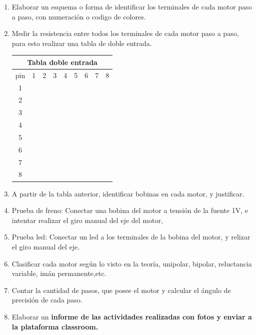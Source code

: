 \documentclass[../main]{subfiles}
\begin{document}
\begin{enumerate}
    \item Elaborar un esquema o forma de identificar los terminales de cada
      motor paso a paso, con numeración o codigo de colores.
    \item Medir la resistencia entre todos los terminales de cada motor
      paso a paso, para esto realizar una tabla de doble entrada.
\begin{center}    
\begin{tabular}{|c||c|c|c|c|c|c|c|c |}
\hline
\multicolumn{9}{|c|}{Tabla doble entrada} \\
\hline\hline
pin & 1 & 2 & 3 & 4 & 5 & 6 & 7 &8\\
\hline\hline
1 & & & & & & & &\\
\hline
2 & & & & & & & &\\
\hline
3 & & & & & & & &\\
\hline
4 & & & & & & & &\\
\hline
5 & & & & & & & &\\
\hline
6 & & & & & & & &\\
\hline
7 & & & & & & & &\\
\hline
8 & & & & & & & &\\
\hline
\end{tabular}
\end{center}
    \item A partir de la tabla anterior, identificar bobinas en cada motor, y justificar.
    \item Prueba de freno: Conectar una bobina del motor a tensión de la fuente 1V, e intentar realizar el giro manual del eje del motor,
    \item Prueba led: Conectar un led a los terminales de la bobina del motor, y relizar el giro manual del eje.
    \item Clasificar cada motor según lo visto en la teoría, unipolar, bipolar, reluctancia variable, imán permanente,etc.
    \item Contar la cantidad de pasos, que posee el motor y calcular el ángulo de precisión de cada paso.
    \item Elaborar un \bf{informe} de las actividades realizadas con fotos y enviar a la plataforma classroom.
\end{enumerate}
\end{document}
